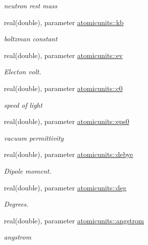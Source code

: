 \begin{DoxyCompactItemize}
\begin{DoxyCompactList}\small\item\em neutron rest mass \end{DoxyCompactList}\item 
real(double), parameter \hyperlink{namespaceatomicunits_afe876defe82137d91908691c6765a5f1}{atomicunits\+::kb}
\begin{DoxyCompactList}\small\item\em boltzman constant \end{DoxyCompactList}\item 
real(double), parameter \hyperlink{namespaceatomicunits_a10a69964ce0d082d71ee5ae34a5a0d24}{atomicunits\+::ev}
\begin{DoxyCompactList}\small\item\em Electon volt. \end{DoxyCompactList}\item 
real(double), parameter \hyperlink{namespaceatomicunits_ae35b35bfa15b571da842371a32dcb2e6}{atomicunits\+::c0}
\begin{DoxyCompactList}\small\item\em speed of light \end{DoxyCompactList}\item 
real(double), parameter \hyperlink{namespaceatomicunits_a45821c6127c356d71ba94bf34b962653}{atomicunits\+::eps0}
\begin{DoxyCompactList}\small\item\em vacuum permittivity \end{DoxyCompactList}\item 
real(double), parameter \hyperlink{namespaceatomicunits_af82c72bfababde1e5da6ac04a43b8570}{atomicunits\+::debye}
\begin{DoxyCompactList}\small\item\em Dipole moment. \end{DoxyCompactList}\item 
real(double), parameter \hyperlink{namespaceatomicunits_af9552fc54f3050b11cce6152261c2bf2}{atomicunits\+::deg}
\begin{DoxyCompactList}\small\item\em Degrees. \end{DoxyCompactList}\item 
real(double), parameter \hyperlink{namespaceatomicunits_a618f9dcd7de9b9ddb53af5bd4f1095c6}{atomicunits\+::angstrom}
\begin{DoxyCompactList}\small\item\em angstrom \end{DoxyCompactList}\item 

\end{DoxyCompactItemize}
